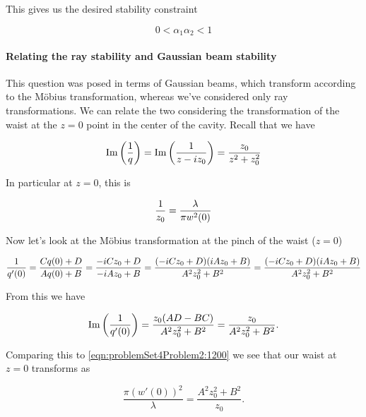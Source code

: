 {This gives us the desired stability constraint

\begin{equation}\label{eqn:problemSet4Problem2:1060}
\boxed{
0 < \alpha_1 \alpha_2 < 1
}
\end{equation}

\paragraph{Relating the ray stability and Gaussian beam stability}

This question was posed in terms of Gaussian beams, which transform according to the M\"obius transformation, whereas we've considered only ray transformations.  We can relate the two considering the transformation of the waist at the $z = 0$ point in the center of the cavity.  Recall that we have

\begin{dmath}\label{eqn:problemSet4Problem2:1180}
\Imag\left( \inv{q} \right)
= \Imag \left( \inv{z - i z_0} \right)
= \frac{z_0}{z^2 + z_0^2}
\end{dmath}

In particular at $z = 0$, this is

\begin{dmath}\label{eqn:problemSet4Problem2:1200}
\inv{z_0} = \frac{\lambda}{\pi w^2(0)}
\end{dmath}

Now let's look at the M\"obius transformation at the pinch of the waist ($z = 0$)

\begin{dmath}\label{eqn:problemSet4Problem2:1220}
\inv{q'(0)}
= \frac{C q(0) + D}{A q(0) + B}
= \frac{-i C z_0 + D}{-i A z_0 + B}
= \frac{(-i C z_0 + D)( i A z_0 + B)}{
A^2 z_0^2 + B^2
}
=
\frac{(-i C z_0 + D)( i A z_0 + B)}{
A^2 z_0^2 + B^2
}
\end{dmath}

From this we have

\begin{dmath}\label{eqn:problemSet4Problem2:1240}
\Imag\left(
\inv{q'(0)}
\right)
=
\frac{ z_0 (A D - B C)}
{
A^2 z_0^2 + B^2
}
=
\frac{ z_0 }
{
A^2 z_0^2 + B^2
}.
\end{dmath}

Comparing this to \ref{eqn:problemSet4Problem2:1200} we see that our waist at $z = 0$ transforms as

\begin{dmath}\label{eqn:problemSet4Problem2:1260}
\frac
{\pi (w'(0))^2}
{\lambda}
=
\frac
{
A^2 z_0^2 + B^2
}
{ z_0 }.
\end{dmath}

}
